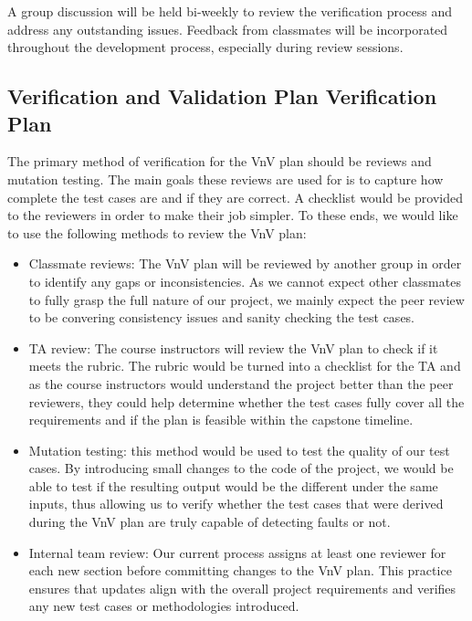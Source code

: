 \documentclass[12pt, titlepage]{article}
\begin{document}
A group discussion will be held bi-weekly to review the verification process and address any outstanding issues. Feedback from classmates will be incorporated throughout the development process, especially during review sessions.

\subsection{Verification and Validation Plan Verification Plan}


The primary method of verification for the VnV plan should be reviews and mutation testing. The main goals these reviews 
are used for is to capture how complete the test cases are and if they are correct. A checklist would be provided
to the reviewers in order to make their job simpler. To these ends, we would like to use 
the following methods to review the VnV plan: 

\begin{itemize}
  \item Classmate reviews: The VnV plan will be reviewed by another group in order to identify any gaps or inconsistencies. 
  As we cannot expect other classmates to fully grasp the full nature of our project, we mainly expect the peer review to be 
  convering consistency issues and sanity checking the test cases. 
  \item TA review: The course instructors will review the VnV plan to check if it meets the rubric. The rubric would be turned into a 
  checklist for the TA and as the course instructors would understand the project better than the peer reviewers, they could help 
  determine whether the test cases fully cover all the requirements and if the plan is feasible within the capstone timeline. 
  \item Mutation testing: this method would be used to test the quality of our test cases. By introducing small changes to the code 
  of the project, we would be able to test if the resulting output would be the different under the same inputs, thus allowing us to 
  verify whether the test cases that were derived during the VnV plan are truly capable of detecting faults or not.
  \item Internal team review: Our current process assigns at least one reviewer for each new section before committing changes to the VnV plan.
  This practice ensures that updates align with the overall project requirements and verifies any new test cases or methodologies introduced.

\end{itemize}
\end{document}

